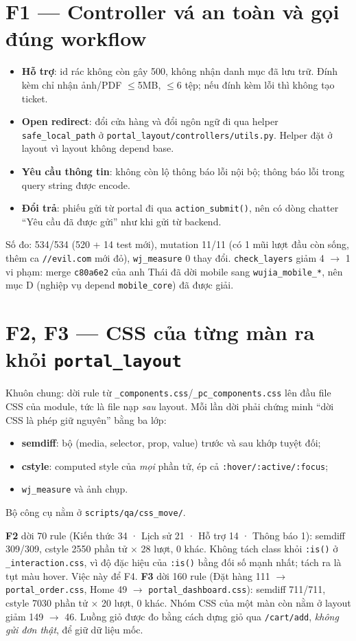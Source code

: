 \section{F1 --- Controller vá an toàn và gọi đúng workflow}

\begin{itemize}[nosep]
\item \textbf{Hỗ trợ}: id rác không còn gây 500, không nhận danh mục đã lưu trữ. Đính kèm chỉ nhận ảnh/PDF
  $\leq$5MB, $\leq$6 tệp; nếu đính kèm lỗi thì không tạo ticket.
\item \textbf{Open redirect}: đổi cửa hàng và đổi ngôn ngữ đi qua helper \texttt{safe\_local\_path} ở
  \texttt{portal\_layout/controllers/utils.py}. Helper đặt ở layout vì layout không depend base.
\item \textbf{Yêu cầu thông tin}: không còn lộ thông báo lỗi nội bộ; thông báo lỗi trong query string được encode.
\item \textbf{Đổi trả}: phiếu gửi từ portal đi qua \texttt{action\_submit()}, nên có dòng chatter
  ``Yêu cầu đã được gửi'' như khi gửi từ backend.
\end{itemize}
Số đo: 534/534 (520 + 14 test mới), mutation 11/11 (có 1 mũi lượt đầu còn sống, thêm ca
\texttt{//evil.com} mới đỏ), \texttt{wj\_measure} 0 thay đổi. \texttt{check\_layers} giảm 4 $\to$ 1 vi phạm: merge
\texttt{c80a6e2} của anh Thái đã dời mobile sang \texttt{wujia\_mobile\_*}, nên mục D (nghiệp vụ depend
\texttt{mobile\_core}) đã được giải.

\section{F2, F3 --- CSS của từng màn ra khỏi \texttt{portal\_layout}}

Khuôn chung: dời rule từ \texttt{\_components.css}/\texttt{\_pc\_components.css} lên đầu file CSS của module,
tức là file nạp \emph{sau} layout. Mỗi lần dời phải chứng minh ``dời CSS là phép giữ nguyên'' bằng ba lớp:
\begin{itemize}[nosep]
\item \textbf{semdiff}: bộ (media, selector, prop, value) trước và sau khớp tuyệt đối;
\item \textbf{cstyle}: computed style của \emph{mọi} phần tử, ép cả \texttt{:hover/:active/:focus};
\item \texttt{wj\_measure} và ảnh chụp.
\end{itemize}
Bộ công cụ nằm ở \texttt{scripts/qa/css\_move/}.

\textbf{F2} dời 70 rule (Kiến thức 34 · Lịch sử 21 · Hỗ trợ 14 · Thông báo 1): semdiff 309/309, cstyle
2550 phần tử × 28 lượt, 0 khác. Không tách class khỏi \texttt{:is()} ở \texttt{\_interaction.css}, vì độ đặc
hiệu của \texttt{:is()} bằng đối số mạnh nhất; tách ra là tụt màu hover. Việc này để F4.
\textbf{F3} dời 160 rule (Đặt hàng 111 $\to$ \texttt{portal\_order.css}, Home 49 $\to$ \texttt{portal\_dashboard.css}):
semdiff 711/711, cstyle 7030 phần tử × 20 lượt, 0 khác. Nhóm CSS của một màn còn nằm ở layout giảm
149 $\to$ 46. Luồng giỏ được đo bằng cách dựng giỏ qua \texttt{/cart/add}, \emph{không gửi đơn thật}, để giữ dữ liệu mốc.

